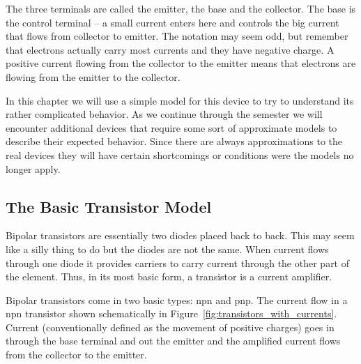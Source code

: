 \documentclass{article}
\begin{document}
The three terminals are called the emitter, the base and the collector. The base is the control terminal -- a small current enters here and controls the big current that flows from collector to emitter. The notation may seem odd, but remember that electrons actually carry most currents and they have negative charge. A positive current flowing from the collector to the emitter means that electrons are flowing from the emitter to the collector.

In this chapter we will use a simple model for this device to try to understand its rather complicated behavior. As we continue through the semester we will encounter additional devices that require some sort of approximate models to describe their expected behavior. Since there are always approximations to the real devices they will have certain shortcomings or conditions were the models no longer apply. 

\subsection{The Basic Transistor Model}
Bipolar transistors are essentially two diodes placed back to back. This may seem like a silly thing to do but the diodes are not the same. When current flows through one diode it provides carriers to carry current through the other part of the element. Thus, in its most basic form, a transistor is a current amplifier.

Bipolar transistors come in two basic types: npn and pnp. The current flow in a npn transistor shown schematically in Figure~\ref{fig:transistors_with_currents}. Current (conventionally defined as the movement of positive charges) goes in through the base terminal and out the emitter and the amplified current flows from the collector to the emitter. 
\end{document}
